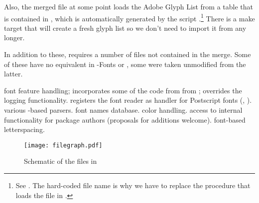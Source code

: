 Also, the merged file at some point loads the Adobe Glyph List from a
\LUA table that is contained in ,
which is automatically generated by the script
.\footnote{%
  See .
  The hard-coded file name is why we have to replace the procedure
  that loads the file in .
}
There is a make target  that will create a fresh
glyph list so we don’t need to import it from \CONTEXT any longer.

In addition to these,  requires a number of
files not contained in the merge. Some of these have no equivalent in
\LUATEX-Fonts or \CONTEXT, some were taken unmodified from the latter.


\beginfilelist
         font feature handling;
                                           incorporates some of the code from
                                            from \CONTEXT;
         overrides the \CONTEXT logging
                                           functionality.
          registers the \OpenType
                                           font reader as handler for
                                           Postscript fonts
                                           (, ).
          various -based parsers.
         font names database.
           color handling.
        access to internal functionality
                                           for package authors
                                           (proposals for additions welcome).
      font-based letterspacing.
\endfilelist

\begin{figure}[b]
  \caption{Schematic of the files in }
  \texttt{[image: filegraph.pdf]}
  \label{file-graph}
\end{figure}

\endsection


